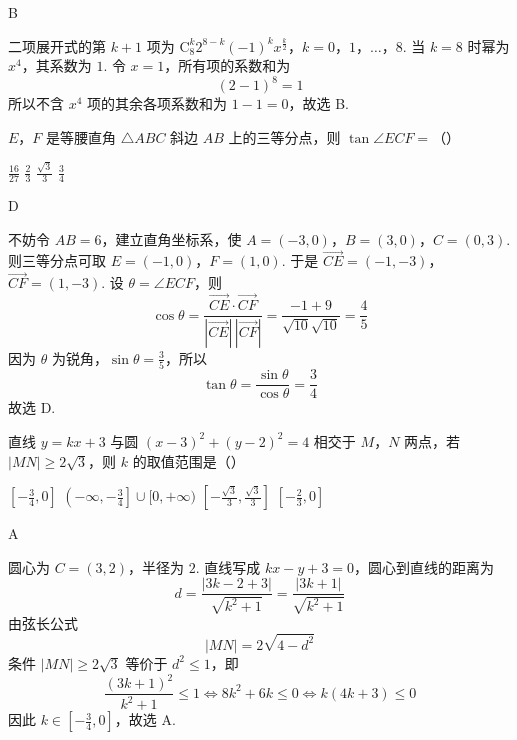 \begin{answer}
B
\end{answer}

\begin{solution}
二项展开式的第 \(k+1\) 项为
\(\mathrm C_8^k2^{8-k}(-1)^k x^{\frac{k}{2}}\)，\(k=0\)，\(1\)，\(\ldots\)，\(8\).
当 \(k=8\) 时幂为 \(x^4\)，其系数为 \(1\). 令 \(x=1\)，所有项的系数和为
\[
(2-1)^8=1
\]
所以不含 \(x^4\) 项的其余各项系数和为 \(1-1=0\)，故选 B.
\end{solution}

\begin{problem}
\(E\)，\(F\) 是等腰直角 \(\triangle ABC\) 斜边 \(AB\) 上的三等分点，则 \(\tan \angle ECF =\)（\quad）

\choices
    {\(\frac{16}{27}\)}
    {\(\frac{2}{3}\)}
    {\(\frac{\sqrt{3}}{3}\)}
    {\(\frac{3}{4}\)}
\end{problem}

\begin{answer}
D
\end{answer}

\begin{solution}
不妨令 \(AB=6\)，建立直角坐标系，使
\(A=(-3,0)\)，\(B=(3,0)\)，\(C=(0,3)\).
则三等分点可取 \(E=(-1,0)\)，\(F=(1,0)\). 于是
\(\overrightarrow{CE}=(-1,-3)\)，\(\overrightarrow{CF}=(1,-3)\).
设 \(\theta=\angle ECF\)，则
\[
\cos\theta
=\frac{\overrightarrow{CE}\cdot\overrightarrow{CF}}{|\overrightarrow{CE}|\,|\overrightarrow{CF}|}
=\frac{-1+9}{\sqrt{10}\sqrt{10}}=\frac45
\]
因为 \(\theta\) 为锐角，\(\sin\theta=\frac35\)，所以
\[
\tan\theta=\frac{\sin\theta}{\cos\theta}=\frac34
\]
故选 D.
\end{solution}

\begin{problem}
直线 \(y = kx + 3\) 与圆 \((x - 3)^2 + (y - 2)^2 = 4\) 相交于 \(M\)，\(N\) 两点，若 \(|MN| \geqslant 2\sqrt{3}\)，则 \(k\) 的取值范围是（\quad）

\choices
    {\(\left[-\frac{3}{4}, 0\right]\)}
    {\(\left(-\infty, -\frac{3}{4}\right] \cup [0, +\infty)\)}
    {\(\left[-\frac{\sqrt{3}}{3}, \frac{\sqrt{3}}{3}\right]\)}
    {\(\left[-\frac{2}{3}, 0\right]\)}
\end{problem}

\begin{answer}
A
\end{answer}

\begin{solution}
圆心为 \(C=(3,2)\)，半径为 \(2\). 直线写成 \(kx-y+3=0\)，圆心到直线的距离为
\[
d=\frac{|3k-2+3|}{\sqrt{k^2+1}}=\frac{|3k+1|}{\sqrt{k^2+1}}
\]
由弦长公式
\[
|MN|=2\sqrt{4-d^2}
\]
条件 \(|MN|\geqslant2\sqrt3\) 等价于 \(d^2\leqslant1\)，即
\[
\frac{(3k+1)^2}{k^2+1}\leqslant1
\Longleftrightarrow 8k^2+6k\leqslant0
\Longleftrightarrow k(4k+3)\leqslant0
\]
因此 \(k\in\left[-\frac34,0\right]\)，故选 A.
\end{solution}

